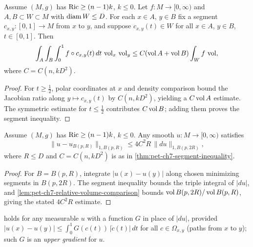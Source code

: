 \begin{theorem}
  \label{thm:pet-ch7-segment-inequality}
  Assume $(M,g)$ has $\operatorname{Ric}\ge(n-1)k$, $k\le0$. Let $f:M\to[0,\infty)$ and
  $A,B\subset W\subset M$ with $\operatorname{diam} W\le D$. For each $x\in A$, $y\in B$ fix a
  segment $c_{x,y}:[0,1]\to M$ from $x$ to $y$, and suppose $c_{x,y}(t)\in W$
  for all $x\in A$, $y\in B$, $t\in[0,1]$. Then
  \[
    \int_A\int_B\int_0^1 f\circ c_{x,y}(t)\,dt\,\operatorname{vol}_x\,\operatorname{vol}_y
    \le C(\operatorname{vol} A+\operatorname{vol} B)\int_Wf\,\operatorname{vol},
  \]
  where $C=C(n,kD^2)$.
\end{theorem}
\begin{proof}
  \sketch
  For \(t\ge\frac12\), polar coordinates at \(x\) and density comparison bound the Jacobian ratio along \(y\mapsto c_{x,y}(t)\) by \(C(n,kD^2)\), yielding a \(C\operatorname{vol} A\) estimate. The symmetric estimate for \(t\le\frac12\) contributes \(C\operatorname{vol} B\); adding them proves the segment inequality.
\end{proof}

\begin{corollary}
  \label{cor:pet-ch7-weak-poincare}
  Assume $(M,g)$ has $\operatorname{Ric}\ge(n-1)k$, $k\le0$. Any smooth $u:M\to[0,\infty)$
  satisfies
  \[
    \|u-u_{B(p,R)}\|_{1,B(p,R)}\le4C^2R\,\|du\|_{1,B(p,2R)},
  \]
  where $R\le D$ and $C=C(n,kD^2)$ is as in \cref{thm:pet-ch7-segment-inequality}.
\end{corollary}
\begin{proof}
  \sketch
  For \(B=B(p,R)\), integrate \(|u(x)-u(y)|\) along chosen minimizing segments in \(B(p,2R)\). The segment inequality bounds the triple integral of \(|du|\), and \cref{lem:pet-ch7-relative-volume-comparison} bounds \(\operatorname{vol} B(p,2R)/\operatorname{vol} B(p,R)\), giving the stated \(4C^2R\) estimate.
\end{proof}

\begin{remark}
  \label{rem:pet-ch7-upper-gradient}
   holds for any measurable $u$ with a function
  $G$ in place of $|du|$, provided $|u(x)-u(y)|\le\int_0^1G(c(t))\,|\dot
  c(t)|\,dt$ for all $c\in\Omega_{x,y}$ (paths from $x$ to $y$); such $G$ is an
  \emph{upper gradient} for $u$.
\end{remark}

